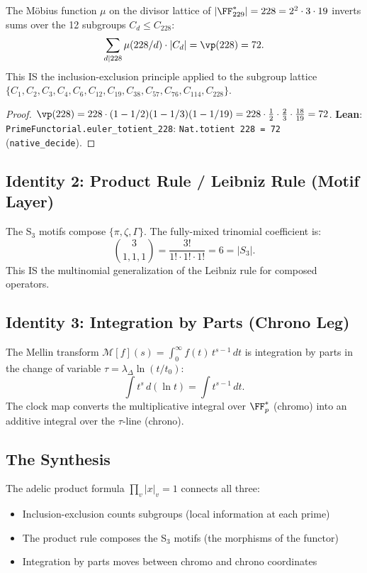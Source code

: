 The Möbius function $\mu$ on the divisor lattice of $|\FF_{229}^*| = 228 = 2^2 \cdot 3 \cdot 19$ inverts sums over the 12 subgroups $C_d \leq C_{228}$:
\[
\sum_{d \mid 228} \mu(228/d) \cdot |C_d| = \vp(228) = 72.
\]
This IS the inclusion-exclusion principle applied to the subgroup lattice $\{C_1, C_2, C_3, C_4, C_6, C_{12}, C_{19}, C_{38}, C_{57}, C_{76}, C_{114}, C_{228}\}$.

\begin{proof}
$\vp(228) = 228 \cdot (1 - 1/2)(1 - 1/3)(1 - 1/19) = 228 \cdot \frac{1}{2} \cdot \frac{2}{3} \cdot \frac{18}{19} = 72$.
\textbf{Lean}: \texttt{PrimeFunctorial.euler\_totient\_228}: \texttt{Nat.totient 228 = 72} (\texttt{native\_decide}).
\end{proof}

\subsection{Identity 2: Product Rule / Leibniz Rule (Motif Layer)}

The S$_3$ motifs compose $\{\pi, \zeta, \Gamma\}$.  The fully-mixed trinomial coefficient is:
\[
\binom{3}{1,1,1} = \frac{3!}{1! \cdot 1! \cdot 1!} = 6 = |S_3|.
\]
This IS the multinomial generalization of the Leibniz rule for composed operators.

\subsection{Identity 3: Integration by Parts (Chrono Leg)}

The Mellin transform $\mathcal{M}[f](s) = \int_0^\infty f(t)\, t^{s-1}\, dt$ is integration by parts in the change of variable $\tau = \lambda_\Delta \ln(t/t_0)$:
\[
\int t^s\, d(\ln t) = \int t^{s-1}\, dt.
\]
The clock map converts the multiplicative integral over $\FF_p^*$ (chromo) into an additive integral over the $\tau$-line (chrono).

\subsection{The Synthesis}


The adelic product formula $\prod_v |x|_v = 1$ connects all three:
\begin{itemize}[noitemsep]
\item Inclusion-exclusion counts subgroups (local information at each prime)
\item The product rule composes the S$_3$ motifs (the morphisms of the functor)
\item Integration by parts moves between chromo and chrono coordinates
\end{itemize}

